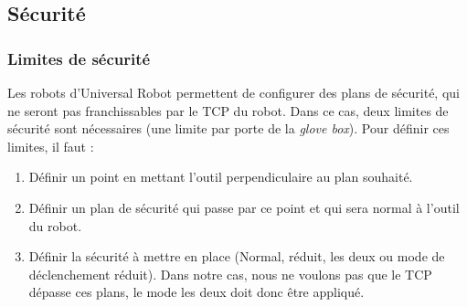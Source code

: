 \subsection{Sécurité}
\subsubsection*{Limites de sécurité}
Les robots d'Universal Robot permettent de configurer des plans de sécurité, qui ne seront pas franchissables par le TCP du robot. Dans ce cas, deux limites de sécurité sont nécessaires (une limite par porte de la \textit{glove box}).
Pour définir ces limites, il faut :
\begin{enumerate}
    \item Définir un point en mettant l'outil perpendiculaire au plan souhaité.
    \item Définir un plan de sécurité qui passe par ce point et qui sera normal à l'outil du robot.
    \item Définir la sécurité à mettre en place (Normal, réduit, les deux ou mode de déclenchement réduit). Dans notre cas, nous ne voulons pas que le TCP dépasse ces plans, le mode \og{}les deux\fg{} doit donc être appliqué.
\end{enumerate}

